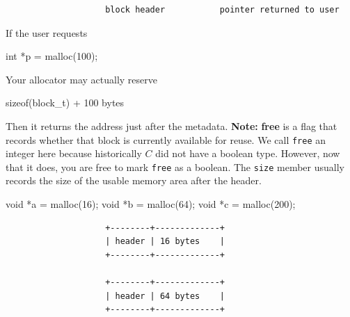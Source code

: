 \documentclass{report}
\begin{document}
\begin{itemize}
\begin{verbatim}
                    block header           pointer returned to user
                \end{verbatim}
                If the user requests
                \bigbreak \noindent
                \begin{cppcode}
                int *p = malloc(100);
                \end{cppcode}
                \bigbreak \noindent 
                Your allocator may actually reserve
                \bigbreak \noindent 
                \begin{cppcode}
                sizeof(block_t) + 100 bytes
                \end{cppcode}
                \bigbreak \noindent 
                Then it returns the address just after the metadata. 
                \bigbreak \noindent 
                \textbf{Note:} \textbf{free} is a flag that records whether that block is currently available for reuse.
                \bigbreak \noindent 
                We call \texttt{free} an integer here because historically $C$ did not have a boolean type. However, now that it does, you are free to mark \texttt{free} as a boolean.
                \bigbreak \noindent 
                The \texttt{size} member usually records the size of the usable memory area after the header.
                \bigbreak \noindent 
                \begin{cppcode}
                    void *a = malloc(16);
                    void *b = malloc(64);
                    void *c = malloc(200);
                \end{cppcode}
                \begin{verbatim}
                    +--------+-------------+
                    | header | 16 bytes    |
                    +--------+-------------+

                    +--------+-------------+
                    | header | 64 bytes    |
                    +--------+-------------+


\end{verbatim}
\end{itemize}
\end{document}
